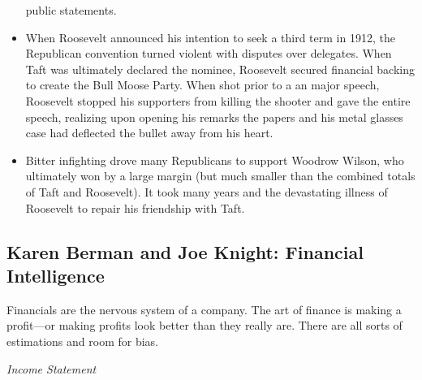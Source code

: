 \documentclass[
]{article}
\begin{document}
\begin{itemize}
  public statements.
\item
  When Roosevelt announced his intention to seek a third term in 1912,
  the Republican convention turned violent with disputes over delegates.
  When Taft was ultimately declared the nominee, Roosevelt secured
  financial backing to create the Bull Moose Party. When shot prior to a
  an major speech, Roosevelt stopped his supporters from killing the
  shooter and gave the entire speech, realizing upon opening his remarks
  the papers and his metal glasses case had deflected the bullet away
  from his heart.
\item
  Bitter infighting drove many Republicans to support Woodrow Wilson,
  who ultimately won by a large margin (but much smaller than the
  combined totals of Taft and Roosevelt). It took many years and the
  devastating illness of Roosevelt to repair his friendship with Taft.
\end{itemize}

\hypertarget{karen-berman-and-joe-knight-financial-intelligence}{%
\subsection{Karen Berman and Joe Knight: Financial
Intelligence}\label{karen-berman-and-joe-knight-financial-intelligence}}

Financials are the nervous system of a company. The art of finance is
making a profit---or making profits look better than they really are.
There are all sorts of estimations and room for bias.

\emph{Income Statement}
\end{document}
